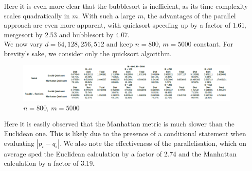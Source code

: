 \documentclass[10pt]{article}
\begin{document}
Here it is even more clear that the bubblesort is inefficient, as its time complexity scales quadratically in $m$. With such a large $m$, the advantages of the parallel approach are even more apparent, with quicksort speeding up by a factor of 1.61, mergesort by 2.53 and bubblesort by 4.07.
\\
We now vary $d = 64, 128, 256, 512$ and keep $n=800$, $m=5000$ constant. For brevity's sake, we consider only the quicksort algorithm.
\begin{figure}[H]
\caption{$n=800$, $m=5000$}
\centering
\includegraphics[width=\textwidth]{n800m5000.png}
\end{figure}
Here it is easily observed that the Manhattan metric is much slower than the Euclidean one. This is likely due to the presence of a conditional statement when evaluating $|p_{i}-q_{i}|$. We also note the effectiveness of the parallelisation, which on average sped the Euclidean calculation by a factor of 2.74 and the Manhattan calculation by a factor of 3.19.
\end{document}
